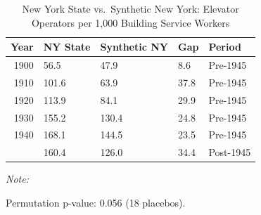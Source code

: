 \begin{table}[!h]
\centering
\caption{New York State vs.~Synthetic New York: Elevator Operators per 1,000 Building Service Workers}
\label{tab:scm_gap}
\centering
\begin{threeparttable}
\begin{tabular}[t]{rllll}
\toprule
Year & NY State & Synthetic NY & Gap & Period\\
\midrule
1900 & 56.5 & 47.9 & 8.6 & Pre-1945\\
1910 & 101.6 & 63.9 & 37.8 & Pre-1945\\
1920 & 113.9 & 84.1 & 29.9 & Pre-1945\\
1930 & 155.2 & 130.4 & 24.8 & Pre-1945\\
1940 & 168.1 & 144.5 & 23.5 & Pre-1945\\
\addlinespace
1950 & 160.4 & 126.0 & 34.4 & Post-1945\\
\bottomrule
\end{tabular}
\begin{tablenotes}
\item \textit{Note: } 
\item Permutation p-value: 0.056 (18 placebos).
\end{tablenotes}
\end{threeparttable}
\end{table}
